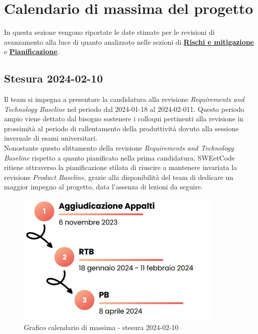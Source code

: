 \documentclass[10pt, a4paper]{article}
\begin{document}
\newpage
\section{Calendario di massima del progetto}
In questa sezione vengono riportate le date stimate per le revisioni di avanzamento alla luce di quanto analizzato nelle sezioni di \hyperref[section:Rischi]{\textbf{Rischi e mitigazione}} e \hyperref[section:Pianificazione]{\textbf{Pianificazione}}.

\subsection{Stesura 2024-02-10}
Il team si impegna a presentare la candidatura alla revisione \textit{Requirements and Technology Baseline\pg} nel periodo dal 2024-01-18 al 2024-02-011. Questo periodo ampio viene dettato dal bisogno sostenere i colloqui pertinenti alla revisione in prossimità al periodo di rallentamento della produttività dovuto alla sessione invernale di esami universitari. \\
Nonostante questo slittamento della revisione \textit{Requirements and Technology Baseline} rispetto a quanto pianificato nella prima candidatura, SWEetCode ritiene attraverso la pianificazione stilata di riuscire a mantenere invariata la revisione \textit{Product Baseline\pg}, grazie alla disponibilità del team di dedicare un maggior impegno al progetto, data l'assenza di lezioni da seguire.
 \begin{figure}[H]
        \centering
        \includegraphics[width=10cm]{Calendario di massima - stesura 2024-02-10.png}
        \caption{Grafico calendario di massima - stesura 2024-02-10}
    \end{figure}

\end{document}
